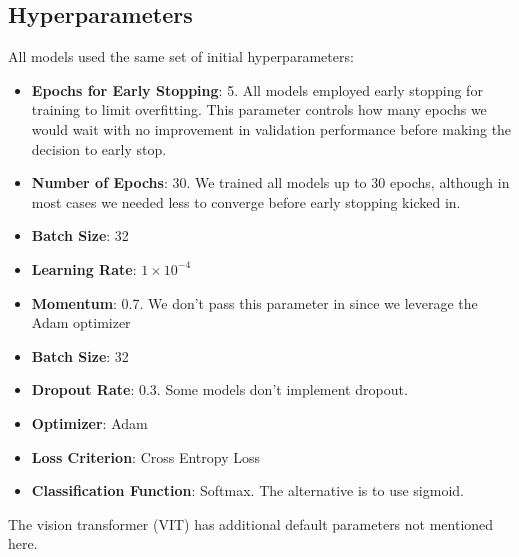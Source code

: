 \documentclass[conference]{IEEEtran}
\begin{document}
\subsection{Hyperparameters}
All models used the same set of initial hyperparameters:
\begin{itemize}
    \item \textbf{Epochs for Early Stopping}: 5. All models employed early stopping for training to limit overfitting. This parameter controls how many epochs we would wait with no improvement in validation performance before making the decision to early stop.
    
    \item \textbf{Number of Epochs}: 30. We trained all models up to 30 epochs, although in most cases we needed less to converge before early stopping kicked in.

    \item \textbf{Batch Size}: 32
    
    \item \textbf{Learning Rate}: $1 \times 10^{-4}$
    
    \item \textbf{Momentum}: 0.7. We don't pass this parameter in since we leverage the Adam optimizer
    
    \item \textbf{Batch Size}: 32

    \item \textbf{Dropout Rate}: 0.3. Some models don't implement dropout.

    \item \textbf{Optimizer}: Adam

    \item \textbf{Loss Criterion}: Cross Entropy Loss

    \item \textbf{Classification Function}: Softmax. The alternative is to use sigmoid.
\end{itemize}

The vision transformer (VIT) has additional default parameters not mentioned here.
\end{document}
